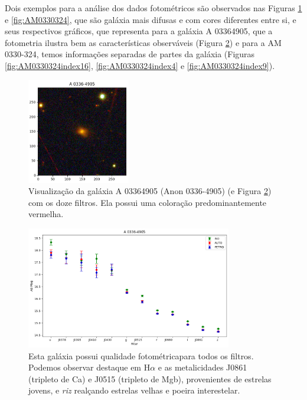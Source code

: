 Dois exemplos para a análise dos dados fotométricos são observados nas Figuras \ref{fig:A03364905} e \ref{fig:AM0330324}, que são galáxia mais difusas e com cores diferentes entre si, e seus respectivos gráficos, que representa para a galáxia A 03364905, que a fotometria ilustra bem as características observáveis (Figura \ref{fig:A03364905exemplo}) e para a AM 0330-324, temos informações separadas de partes da galáxia (Figuras \ref{fig:AM0330324index16}, \ref{fig:AM0330324index4} e \ref{fig:AM0330324index9}).

\begin{figure}[!h]
  \centering 
  \includegraphics[width=0.4\textwidth]{Imagens/A03364905.png} 
  \caption[Galáxia A 03364905 (Anon 0336-4905) com a combinação dos doze filtros.]{Visualização da galáxia A 03364905 (Anon 0336-4905) (e Figura \ref{fig:A03364905exemplo}) com os doze filtros. Ela possui uma coloração predominantemente vermelha.}
  \label{fig:A03364905} 
\end{figure}

\begin{figure}[h]
  \centering 
  \includegraphics[width=0.8\textwidth]{Imagens/A03364905exemplo.png} 
  \caption[Magnitudes da galáxia A 03364905 (Anon 0336-4905).]{Esta galáxia possui qualidade fotométricapara todos os filtros. Podemos observar destaque em H$\alpha$ e as metalicidades J0861 (tripleto de Ca) e J0515 (tripleto de Mgb), provenientes de estrelas jovens, e \emph{riz} realçando estrelas velhas e poeira interestelar.}
  \label{fig:A03364905exemplo} 
\end{figure}

